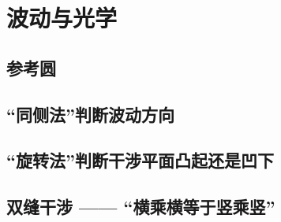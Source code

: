 
\chapter{波动与光学}

\section{参考圆}

\section{“同侧法”判断波动方向}

\section{“旋转法”判断干涉平面凸起还是凹下}

\section{双缝干涉 —— “横乘横等于竖乘竖”}

